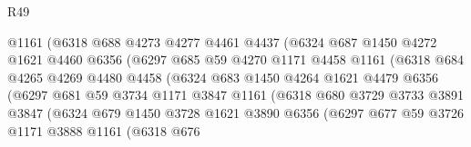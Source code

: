 \begin{lexlean}{R49}
\begin{coremodule}
                          @1161
                          (@6318
                            @688
                            @4273
                            @4277
                            @4461
                            @4437
                            (@6324
                              @687
                              @1450
                              @4272
                              @1621
                              @4460
                              @6356
                              (@6297
                                @685
                                @59
                                @4270
                                @1171
                                @4458
                                @1161
                                (@6318
                                  @684
                                  @4265
                                  @4269
                                  @4480
                                  @4458
                                  (@6324
                                    @683
                                    @1450
                                    @4264
                                    @1621
                                    @4479
                                    @6356
                                    (@6297
                                      @681
                                      @59
                                      @3734
                                      @1171
                                      @3847
                                      @1161
                                      (@6318
                                        @680
                                        @3729
                                        @3733
                                        @3891
                                        @3847
                                        (@6324
                                          @679
                                          @1450
                                          @3728
                                          @1621
                                          @3890
                                          @6356
                                          (@6297
                                            @677
                                            @59
                                            @3726
                                            @1171
                                            @3888
                                            @1161
                                            (@6318
                                              @676

\end{coremodule}
\end{lexlean}
